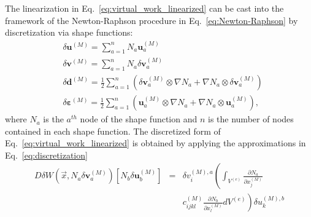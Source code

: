 The linearization in Eq.\ \eqref{eq:virtual_work_linearized} can be cast into the framework of the Newton-Raphson procedure in Eq.\ \eqref{eq:Newton-Raphson} by discretization via shape functions:
%
\begin{align}
&\delta \pmb{u}^{(M)} = \sum_{a=1}^n N_a \pmb{u}_a^{(M)} \nonumber\\
%
&\delta \pmb{v}^{(M)} = \sum_{a=1}^n N_a \delta \pmb{v}_a^{(M)} \nonumber\\
%
&\delta \pmb{d}^{(M)} = \frac{1}{2} \sum_{a=1}^n (\delta \pmb{v}_a^{(M)} \otimes \nabla N_a + \nabla N_a \otimes \delta \pmb{v}_a^{(M)}) \nonumber\\
%
&\delta \pmb{\varepsilon}^{(M)} = \frac{1}{2} \sum_{a=1}^n (\pmb{u}_a^{(M)} \otimes \nabla N_a + \nabla N_a \otimes \pmb{u}_a^{(M)}),
\label{eq:discretization}
\end{align}
%
where $N_a$ is the $a^{th}$ node of the shape function and $n$ is the number of nodes contained in each shape function. The discretized form of Eq.\ \eqref{eq:virtual_work_linearized} is obtained by applying the approximations in Eq.\ \eqref{eq:discretization} 
%
\begin{eqnarray}
D\delta W(\vec{x},N_a\delta \pmb{v}_a^{(M)})[N_b\delta \pmb{u}_b^{(M)}] &=&\delta v_i^{(M),a}\left(\int_{V^{(e)}}\frac{\partial N_a}{\partial x_j^{(M)}} \right.\nonumber\\
&&\left.c_{ijkl}^{(M)} \frac{\partial N_b}{\partial x_l^{(M)}} dV^{(e)} \right) \delta u_k^{(M),b} 
\end{eqnarray}
%

